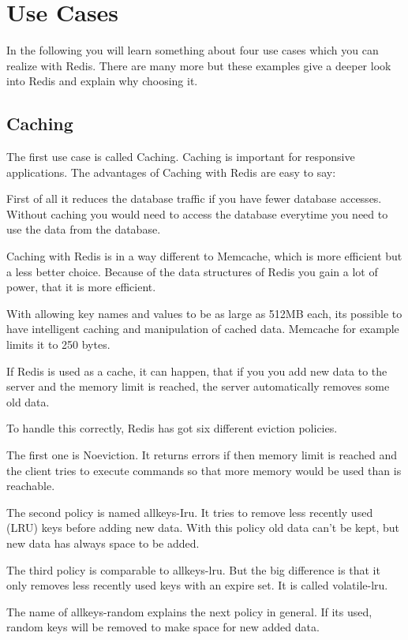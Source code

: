 
\section{Use Cases}
In the following you will learn something about four use cases which you can realize with Redis. There are many more but these examples give a deeper look into Redis and explain why choosing it.
\subsection{Caching}
The first use case is called Caching. Caching is important for responsive applications. The advantages of Caching with Redis are easy to say:

First of all it reduces the database traffic if you have fewer database accesses. Without caching you would need to access the database everytime you need to use the data from the database.
\cite{RedisLabsS}

Caching with Redis is in a way different to Memcache, which is more efficient but a less better choice. Because of the data structures of Redis you gain a lot of power, that it is more efficient.

With allowing key names and values to be as large as 512MB each, its possible to have intelligent caching and manipulation of cached data. Memcache for example limits it to 250 bytes.\cite{Haber}

If Redis is used as a cache, it can happen, that if you you add new data to the server and the memory limit is reached, the server automatically removes some old data.

To handle this correctly, Redis has got six different eviction policies.

The first one is Noeviction. It returns errors if then memory limit is reached and the client tries to execute commands so that more memory would be used than is reachable.

The second policy is named allkeys-Iru. It tries to remove less recently used (LRU) keys before adding new data. With this policy old data can’t be kept, but new data has always space to be added.

The third policy is comparable to allkeys-lru. But the big difference is that it only removes less recently used keys with an expire set. It is called volatile-lru.

The name of allkeys-random explains the next policy in general. If its used, random keys will be removed to make space for new added data.

